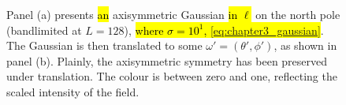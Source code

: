 \begin{figure}[htpb]
	\centering\capstart{}
	\hfill
	\caption[
		A Gaussian on the north pole and then translated
	]{
		Panel (a) presents \hl{an} axisymmetric Gaussian \hl{in \mbox{\(\ell{}\)}} on the north pole (bandlimited at \(L=128\)), \hl{where \mbox{\(\sigma=10^{1}\)}, \cf{} \mbox{\cref{eq:chapter3_gaussian}}}.
		The Gaussian is then translated to some \(\omega'=(\theta',\phi')\), as shown in panel (b).
		Plainly, the axisymmetric symmetry has been preserved under translation.
		The colour is between zero and one, reflecting the scaled intensity of the field.
	}\label{fig:chapter3_gaussian}
\end{figure}
